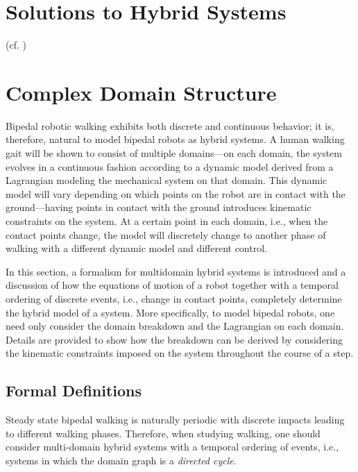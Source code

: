 \section{Solutions to Hybrid Systems}
(cf. \cite{Ye1998})

\section{Complex Domain Structure}
Bipedal robotic walking exhibits both discrete and continuous behavior; it is, therefore, natural to model bipedal robots as hybrid systems.
%
A human walking gait will be shown to consist of multiple domains---on each domain, the system evolves in a continuous fashion according to a dynamic model derived from a Lagrangian modeling the mechanical system on that domain.
%
This dynamic model will vary depending on which points on the robot are in contact with the ground---having points in contact with the ground introduces kinematic constraints on the system.
%
At a certain point in each domain, i.e., when the contact points change, the model will discretely change to another phase of walking with a different dynamic model and different control.
%

In this section, a formalism for multidomain hybrid systems is introduced and a discussion of how the equations of motion of a robot together with a temporal ordering of discrete events, i.e., change in contact points, completely determine the hybrid model of a system.
%
More specifically, to model bipedal robots, one need only consider the domain breakdown and the Lagrangian on each domain.
%
Details are provided to show how the breakdown can be derived by considering the kinematic constraints imposed on the system throughout the course of a step.


\subsection{Formal Definitions}

Steady state bipedal walking is naturally periodic with discrete impacts leading to different walking phases.
%
Therefore, when studying walking, one should consider multi-domain hybrid systems with a temporal ordering of events, i.e., systems in which the domain graph is a {\em directed cycle}.

